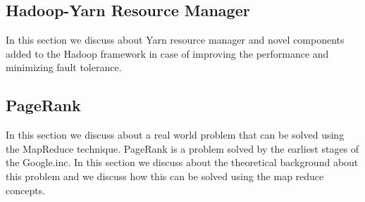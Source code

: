 \subsection{Hadoop-Yarn Resource Manager}

In this section we discuss about Yarn resource manager and novel components added to the
Hadoop framework in case of improving the performance and minimizing fault tolerance. 

\subsection{PageRank}

In this section we discuss about a real world problem that can be solved using the MapReduce
technique. PageRank is a problem solved by the earliest stages of the Google.inc. In this
section we discuss about the theoretical background about this problem and we discuss how this
can be solved using the map reduce concepts.

